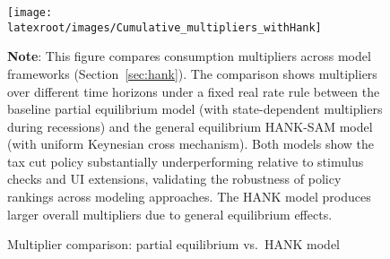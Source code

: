 \documentclass{econsocart}
\begin{document}
\begin{figure}[htb] 
  \centering
  \caption{Multiplier comparison: partial equilibrium vs.\ HANK model}
  \label{fig:HANK_multipliers} 
  \texttt{[image: \\latexroot/images/Cumulative\_multipliers\_withHank]}

  \medskip
  \noindent\parbox{\textwidth}{\footnotesize
    \textbf{Note}: This figure compares consumption multipliers across model frameworks (Section~\ref{sec:hank}).
    The comparison shows multipliers over different time horizons under a fixed real rate rule
    between the baseline partial equilibrium model (with state-dependent multipliers during recessions)
    and the general equilibrium HANK-SAM model (with uniform Keynesian cross mechanism).
    Both models show the tax cut policy substantially underperforming relative to stimulus checks
    and UI extensions, validating the robustness of policy rankings across modeling approaches.
    The HANK model produces larger overall multipliers due to general equilibrium effects.
  }
\end{figure}

\vspace{0.5em}
\end{document}

